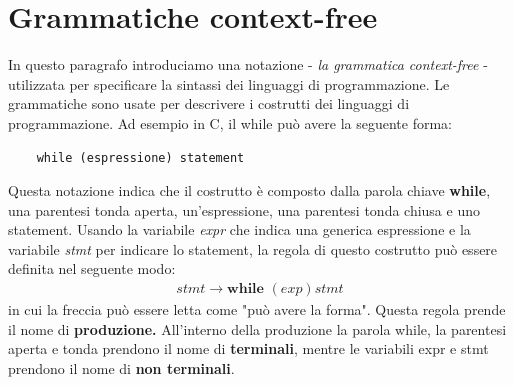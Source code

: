 \section{Grammatiche context-free}
In questo paragrafo introduciamo una notazione - \textit{la grammatica context-free} - utilizzata per specificare la sintassi dei linguaggi di programmazione. Le grammatiche sono usate per descrivere i costrutti dei linguaggi di programmazione. Ad esempio in C, il while può avere la seguente forma:
\lstset{language=C}
\begin{lstlisting}
	while (espressione) statement 
\end{lstlisting}
Questa notazione indica che il costrutto è composto dalla parola chiave \textbf{while}, una parentesi tonda aperta, un'espressione, una parentesi tonda chiusa e uno statement. Usando la variabile \textit{expr} che indica una generica espressione e la variabile \textit{stmt} per indicare lo statement, la regola di questo costrutto può essere definita nel seguente modo:
\begin{align}\label{regolaWhile}
	stmt \to \textbf{while } ( exp ) stmt 
\end{align}
in cui la freccia può essere letta come "può avere la forma". Questa regola prende il nome di \textbf{produzione. }All'interno della produzione la parola while, la parentesi aperta e tonda prendono il nome di \textbf{terminali}, mentre le variabili expr e stmt prendono il nome di \textbf{non terminali}.
